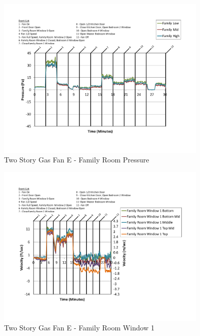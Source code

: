 \documentclass{article}
\begin{document}
\begin{appendices}
	\begin{figure}[H]
		\centering
		\includegraphics[height=3.05in,trim=0.67in 1.1in 0.67in 0.8in,clip=true]{0_Images/Results_Charts/ColdFlow/Two_Story/Gas/E/Family_Room_Pressure.pdf}
		\caption{Two Story Gas Fan E - Family Room Pressure}
	\end{figure}
 

	\begin{figure}[H]
		\centering
		\includegraphics[height=3.05in,trim=0.67in 1.1in 0.67in 0.8in,clip=true]{0_Images/Results_Charts/ColdFlow/Two_Story/Gas/E/Family_Room_Window_1.pdf}
		\caption{Two Story Gas Fan E - Family Room Window 1}
	\end{figure}
 
	\clearpage


\end{appendices}
\end{document}
